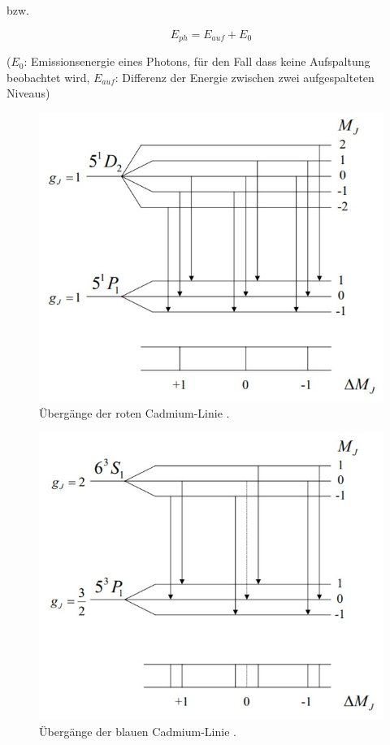 bzw.

\begin{equation}
	E_{ph} = E_{auf} + E_0
\end{equation}

($E_0$: Emissionsenergie eines Photons, für den Fall dass keine Aufspaltung beobachtet wird, $E_{auf}$: Differenz der
Energie zwischen zwei aufgespalteten Niveaus)

\begin{figure}
\centering
\includegraphics[width=\textwidth]{termschema_rotelinie.jpg}
\caption{Übergänge der roten Cadmium-Linie \cite{unibonn}.}
\label{fig:termschemarot}
\end{figure}

\begin{figure}
\centering
\includegraphics[width=\textwidth]{termschema_blauelinie.jpg}
\caption{Übergänge der blauen Cadmium-Linie \cite{unibonn}.}
\label{fig:termschemablau}
\end{figure}

